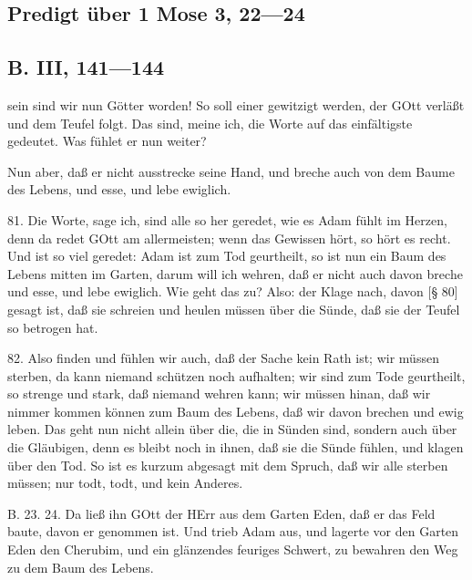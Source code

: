 \subsection{Predigt über 1 Mose 3, 22—24}

\subsection{B. III, 141—144}

sein sind wir nun Götter worden! So soll einer gewitzigt werden, der GOtt verläßt und dem Teufel folgt. Das sind, meine ich, die Worte auf das einfältigste gedeutet. Was fühlet er nun weiter?

Nun aber, daß er nicht ausstrecke seine Hand, und breche auch von dem Baume des Lebens, und esse, und lebe ewiglich.

81. Die Worte, sage ich, sind alle so her geredet, wie es Adam fühlt im Herzen, denn da redet GOtt am allermeisten; wenn das Gewissen hört, so hört es recht. Und ist so viel geredet: Adam ist zum Tod geurtheilt, so ist nun ein Baum des Lebens mitten im Garten, darum will ich wehren, daß er nicht auch davon breche und esse, und lebe ewiglich. Wie geht das zu? Also: der Klage nach, davon [§ 80] gesagt ist, daß sie schreien und heulen müssen über die Sünde, daß sie der Teufel so betrogen hat.

82. Also finden und fühlen wir auch, daß der Sache kein Rath ist; wir müssen sterben, da kann niemand schützen noch aufhalten; wir sind zum Tode geurtheilt, so strenge und stark, daß niemand wehren kann; wir müssen hinan, daß wir nimmer kommen können zum Baum des Lebens, daß wir davon brechen und ewig leben. Das geht nun nicht allein über die, die in Sünden sind, sondern auch über die Gläubigen, denn es bleibt noch in ihnen, daß sie die Sünde fühlen, und klagen über den Tod. So ist es kurzum abgesagt mit dem Spruch, daß wir alle sterben müssen; nur todt, todt, und kein Anderes.

B. 23. 24. Da ließ ihn GOtt der HErr aus dem Garten Eden, daß er das Feld baute, davon er genommen ist. Und trieb Adam aus, und lagerte vor den Garten Eden den Cherubim, und ein glänzendes feuriges Schwert, zu bewahren den Weg zu dem Baum des Lebens.

